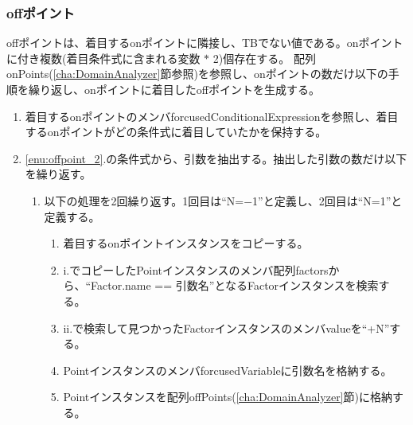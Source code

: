\documentclass[uplatex, report, a4j, 10pt]{jsbook}
\begin{document}
\subsubsection{offポイント}
offポイントは、着目するonポイントに隣接し、TBでない値である。onポイントに付き複数(着目条件式に含まれる変数 $*$ 2)個存在する。
配列onPoints(\ref{cha:DomainAnalyzer}節参照)を参照し、onポイントの数だけ以下の手順を繰り返し、onポイントに着目したoffポイントを生成する。
\begin{enumerate}
  \item\label{enu:offpoint_2} 着目するonポイントのメンバforcusedConditionalExpressionを参照し、着目するonポイントがどの条件式に着目していたかを保持する。
  \item \ref{enu:offpoint_2}.の条件式から、引数を抽出する。抽出した引数の数だけ以下を繰り返す。
        \begin{enumerate}
          \item 以下の処理を2回繰り返す。1回目は“N=$-$1”と定義し、2回目は“N=1”と定義する。
                \begin{enumerate}
                  \item\label{enu:offpoint_3} 着目するonポイントインスタンスをコピーする。
                  \item\label{enu:offpoint_1} i.でコピーしたPointインスタンスのメンバ配列factorsから、“Factor.name == 引数名”となるFactorインスタンスを検索する。
                  \item ii.で検索して見つかったFactorインスタンスのメンバvalueを“+N”する。
                  \item PointインスタンスのメンバforcusedVariableに引数名を格納する。
                  \item Pointインスタンスを配列offPoints(\ref{cha:DomainAnalyzer}節)に格納する。
                \end{enumerate}
        \end{enumerate}
\end{enumerate}
\end{document}
